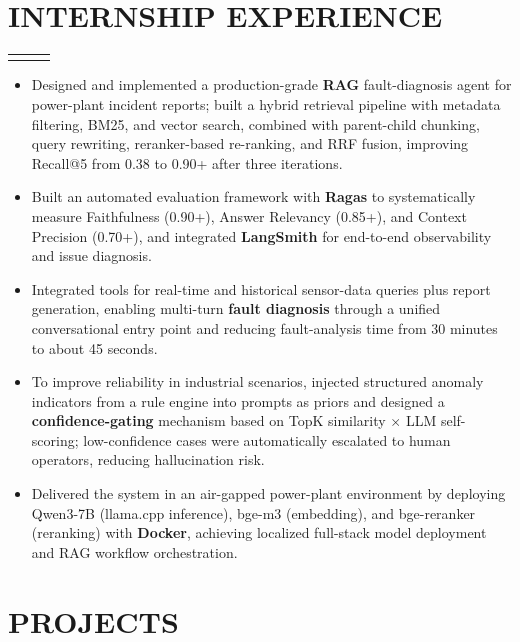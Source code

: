 \documentclass[a4paper,12pt]{article}
\newcommand{\threeColumn}[3]{
  \begin{tabularx}{\textwidth}{>{\setlength\hsize{0.75\hsize}}X>{\setlength\hsize{1.55\hsize}}X>{\setlength\hsize{0.7\hsize}}X}
    \raggedright\arraybackslash{#1} & \centering{#2} & \raggedleft\arraybackslash{#3} \\
  \end{tabularx}
}
\newcommand{\resumeItemListStart}{\begin{itemize}[leftmargin=*]}
\newcommand{\resumeItemListEnd}{\end{itemize}}
\newcommand{\resumeItem}[1]{\item{#1}}
\begin{document}
\section{INTERNSHIP EXPERIENCE}
\threeColumn{Software Developer Intern}{Shanghai Xinhua Control Technology (Chint Group)}{Nov. 2025 -- Apr. 2026}
\vspace{-0.5em}
\resumeItemListStart
\resumeItem{Designed and implemented a production-grade \textbf{RAG} fault-diagnosis agent for power-plant incident reports; built a hybrid retrieval pipeline with metadata filtering, BM25, and vector search, combined with parent-child chunking, query rewriting, reranker-based re-ranking, and RRF fusion, improving Recall@5 from 0.38 to 0.90+ after three iterations.}
\resumeItem{Built an automated evaluation framework with \textbf{Ragas} to systematically measure Faithfulness (0.90+), Answer Relevancy (0.85+), and Context Precision (0.70+), and integrated \textbf{LangSmith} for end-to-end observability and issue diagnosis.}
\resumeItem{Integrated tools for real-time and historical sensor-data queries plus report generation, enabling multi-turn \textbf{fault diagnosis} through a unified conversational entry point and reducing fault-analysis time from 30 minutes to about 45 seconds.}
\resumeItem{To improve reliability in industrial scenarios, injected structured anomaly indicators from a rule engine into prompts as priors and designed a \textbf{confidence-gating} mechanism based on TopK similarity $\times$ LLM self-scoring; low-confidence cases were automatically escalated to human operators, reducing hallucination risk.}
\resumeItem{Delivered the system in an air-gapped power-plant environment by deploying Qwen3-7B (llama.cpp inference), bge-m3 (embedding), and bge-reranker (reranking) with \textbf{Docker}, achieving localized full-stack model deployment and RAG workflow orchestration.}
\resumeItemListEnd

\section{PROJECTS}
\end{document}
